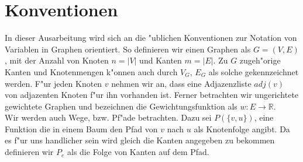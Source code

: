\section{Konventionen}
In dieser Ausarbeitung wird sich an die "ublichen Konventionen zur Notation
    von Variablen in Graphen orientiert. So definieren wir einen Graphen als
    $G = (V,E)$, mit der Anzahl von Knoten $n = |V|$ und Kanten $m = |E|$.
    Zu $G$ zugeh"orige Kanten und Knotenmengen k"onnen auch durch $V_G$, $E_G$
    als solche gekennzeichnet werden.
    F"ur jeden Knoten $v$ nehmen wir an, dass eine Adjazenzliste $adj(v)$ von
    adjazenten Knoten f"ur ihn vorhanden ist.
    Ferner betrachten wir ungerichtete gewichtete Graphen und bezeichnen 
    die Gewichtungsfunktion als $w: E \rightarrow \mathbb{R}$.\\
Wir werden auch Wege, bzw. Pf"ade betrachten. 
    Dazu sei $P(\{v,u\})$, eine Funktion die in einem Baum den Pfad 
    von $v$ nach $u$ als Knotenfolge angibt. Da es f"ur uns handlicher sein wird
    gleich die Kanten angegeben zu bekommen definieren wir $P_e$ als die Folge von
    Kanten auf dem Pfad.\\
